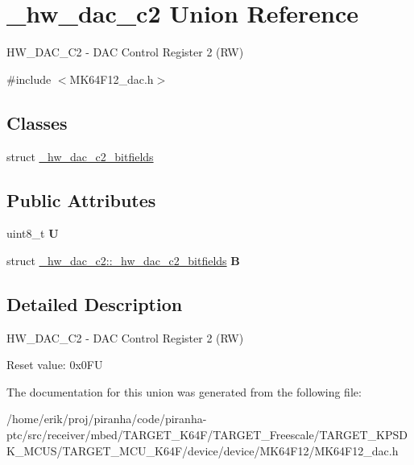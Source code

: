 \hypertarget{union__hw__dac__c2}{}\section{\+\_\+hw\+\_\+dac\+\_\+c2 Union Reference}
\label{union__hw__dac__c2}


H\+W\+\_\+\+D\+A\+C\+\_\+\+C2 -\/ D\+AC Control Register 2 (RW)  




{\ttfamily \#include $<$M\+K64\+F12\+\_\+dac.\+h$>$}

\subsection*{Classes}
\begin{DoxyCompactItemize}
\item 
struct \hyperlink{struct__hw__dac__c2_1_1__hw__dac__c2__bitfields}{\+\_\+hw\+\_\+dac\+\_\+c2\+\_\+bitfields}
\end{DoxyCompactItemize}
\subsection*{Public Attributes}
\begin{DoxyCompactItemize}
\item 
uint8\+\_\+t {\bfseries U}\hypertarget{union__hw__dac__c2_af318fd8bbaa1ce1c7a6b7b990af1c6de}{}\label{union__hw__dac__c2_af318fd8bbaa1ce1c7a6b7b990af1c6de}

\item 
struct \hyperlink{struct__hw__dac__c2_1_1__hw__dac__c2__bitfields}{\+\_\+hw\+\_\+dac\+\_\+c2\+::\+\_\+hw\+\_\+dac\+\_\+c2\+\_\+bitfields} {\bfseries B}\hypertarget{union__hw__dac__c2_a75d148f24828ddded44c76c2041a92fa}{}\label{union__hw__dac__c2_a75d148f24828ddded44c76c2041a92fa}

\end{DoxyCompactItemize}


\subsection{Detailed Description}
H\+W\+\_\+\+D\+A\+C\+\_\+\+C2 -\/ D\+AC Control Register 2 (RW) 

Reset value\+: 0x0\+FU 

The documentation for this union was generated from the following file\+:\begin{DoxyCompactItemize}
\item 
/home/erik/proj/piranha/code/piranha-\/ptc/src/receiver/mbed/\+T\+A\+R\+G\+E\+T\+\_\+\+K64\+F/\+T\+A\+R\+G\+E\+T\+\_\+\+Freescale/\+T\+A\+R\+G\+E\+T\+\_\+\+K\+P\+S\+D\+K\+\_\+\+M\+C\+U\+S/\+T\+A\+R\+G\+E\+T\+\_\+\+M\+C\+U\+\_\+\+K64\+F/device/device/\+M\+K64\+F12/M\+K64\+F12\+\_\+dac.\+h\end{DoxyCompactItemize}
